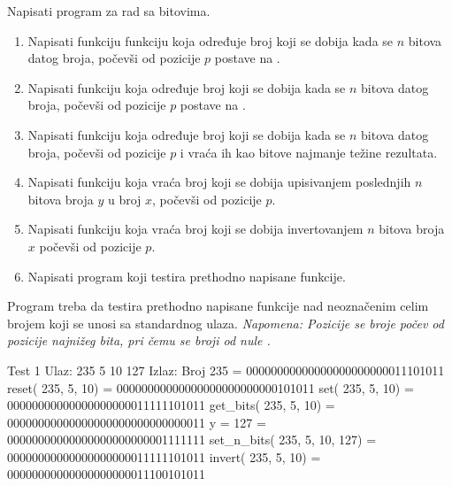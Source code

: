 \begin{Exercise}[label=204]
Napisati program za rad sa bitovima.
\begin{enumerate}
\item Napisati funkciju funkciju koja određuje broj koji se dobija kada se $n$ bitova datog broja, počevši od pozicije $p$ postave na .
\item Napisati funkciju koja određuje broj koji se dobija kada se $n$ bitova datog broja, počevši od pozicije $p$ postave na .
\item Napisati funkciju koja određuje broj koji se dobija kada se $n$ bitova datog broja, počevši od pozicije $p$ i vraća ih kao bitove najmanje težine rezultata.
\item Napisati funkciju koja vraća broj koji se dobija upisivanjem poslednjih $n$ bitova broja $y$ u broj $x$, počevši od pozicije $p$.
\item Napisati funkciju koja vraća broj koji se dobija invertovanjem $n$ bitova broja $x$ počevši od pozicije $p$.
\item Napisati program koji testira prethodno napisane funkcije.
\end{enumerate}
Program treba da testira prethodno napisane funkcije nad neoznačenim celim brojem koji se unosi sa standardnog ulaza.
\emph{Napomena: Pozicije se broje počev od pozicije najnižeg bita, pri čemu se broji od nule .}

\begin{maxitest}
\begin{test}{Test 1}
Ulaz:   235 5 10 127  
Izlaz:  
  Broj   235                          = 00000000000000000000000011101011
  reset(  235,    5,   10)            = 00000000000000000000000000101011
  set(  235,    5,   10)              = 00000000000000000000011111101011
  get_bits(  235,    5,   10)         = 00000000000000000000000000000011
  y =                             127 = 00000000000000000000000001111111
  set_n_bits(  235,    5,   10,  127) = 00000000000000000000011111101011
  invert(  235,    5,   10)           = 00000000000000000000011100101011
\end{test}
\end{maxitest}

\end{Exercise}
\begin{Answer}[ref=204]
\end{Answer}


